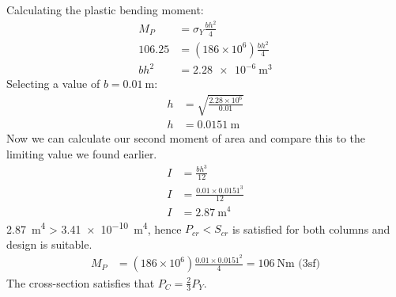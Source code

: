 \documentclass[11pt]{article}
\numberwithin{equation}{section}
\begin{document}
Calculating the plastic bending moment:
\begin{align}
    M_P &= \sigma_Y \frac{bh^2}{4}\\
    106.25 &= (186\times 10^6)\frac{bh^2}{4}\\
    bh^2 &= \SI{2.28e-6}{\meter^3}
\end{align}
Selecting a value of $b = \SI{0.01}{\meter}$:
\begin{align}
    h &= \sqrt{\frac{2.28\times 10^6}{0.01}}\\
    h &= \SI{0.0151}{\meter}
\end{align}
Now we can calculate our second moment of area and compare this to the limiting value we found earlier. 
\begin{align}
    I &= \frac{bh^3}{12}\\
    I &= \frac{0.01 \times 0.0151^3}{12}\\
    I &= \SI{2.87}{\meter\tothe{4}}
\end{align}
\SI{2.87}{\meter\tothe{4}} > \SI{3.41e-10}{\meter\tothe{4}}, hence $P_{cr} < S_{cr}$ is satisfied for both columns and design is suitable. 
\begin{align}
    M_P &= (186\times 10^6)\frac{0.01 \times 0.0151^2}{4} = \SI{106}{\newton \meter} \textrm{ (3sf)}
\end{align}
The cross-section satisfies that $P_C = \frac{2}{3} P_Y$. 
\end{document}
